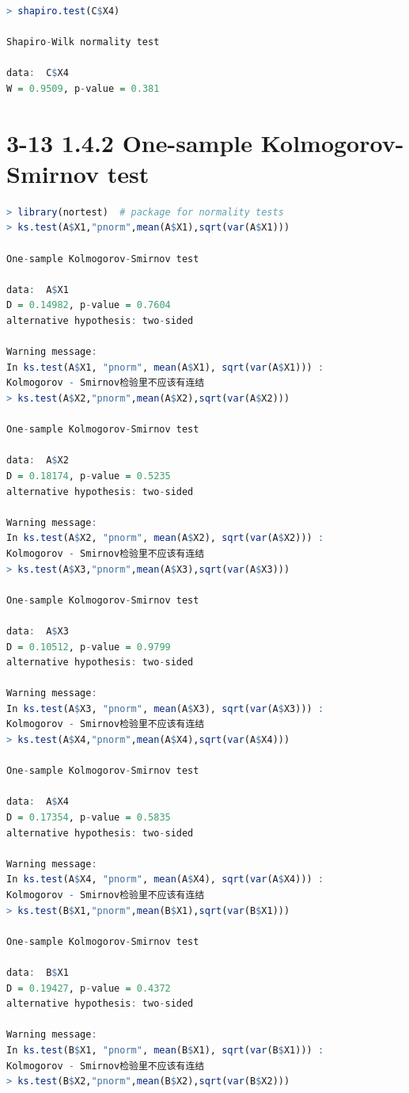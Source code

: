 \documentclass[11pt,a4paper]{ctexart}
\begin{document}
\begin{appendices}
\begin{lstlisting}[language=r]
> shapiro.test(C$X4)

Shapiro-Wilk normality test

data:  C$X4
W = 0.9509, p-value = 0.381

\end{lstlisting}
\section{3-13 1.4.2 One-sample Kolmogorov-Smirnov test}
\begin{lstlisting}[language=r]
> library(nortest)  # package for normality tests
> ks.test(A$X1,"pnorm",mean(A$X1),sqrt(var(A$X1)))

One-sample Kolmogorov-Smirnov test

data:  A$X1
D = 0.14982, p-value = 0.7604
alternative hypothesis: two-sided

Warning message:
In ks.test(A$X1, "pnorm", mean(A$X1), sqrt(var(A$X1))) :
Kolmogorov - Smirnov检验里不应该有连结
> ks.test(A$X2,"pnorm",mean(A$X2),sqrt(var(A$X2)))

One-sample Kolmogorov-Smirnov test

data:  A$X2
D = 0.18174, p-value = 0.5235
alternative hypothesis: two-sided

Warning message:
In ks.test(A$X2, "pnorm", mean(A$X2), sqrt(var(A$X2))) :
Kolmogorov - Smirnov检验里不应该有连结
> ks.test(A$X3,"pnorm",mean(A$X3),sqrt(var(A$X3)))

One-sample Kolmogorov-Smirnov test

data:  A$X3
D = 0.10512, p-value = 0.9799
alternative hypothesis: two-sided

Warning message:
In ks.test(A$X3, "pnorm", mean(A$X3), sqrt(var(A$X3))) :
Kolmogorov - Smirnov检验里不应该有连结
> ks.test(A$X4,"pnorm",mean(A$X4),sqrt(var(A$X4)))

One-sample Kolmogorov-Smirnov test

data:  A$X4
D = 0.17354, p-value = 0.5835
alternative hypothesis: two-sided

Warning message:
In ks.test(A$X4, "pnorm", mean(A$X4), sqrt(var(A$X4))) :
Kolmogorov - Smirnov检验里不应该有连结
> ks.test(B$X1,"pnorm",mean(B$X1),sqrt(var(B$X1)))

One-sample Kolmogorov-Smirnov test

data:  B$X1
D = 0.19427, p-value = 0.4372
alternative hypothesis: two-sided

Warning message:
In ks.test(B$X1, "pnorm", mean(B$X1), sqrt(var(B$X1))) :
Kolmogorov - Smirnov检验里不应该有连结
> ks.test(B$X2,"pnorm",mean(B$X2),sqrt(var(B$X2)))


\end{lstlisting}
\end{appendices}
\end{document}
